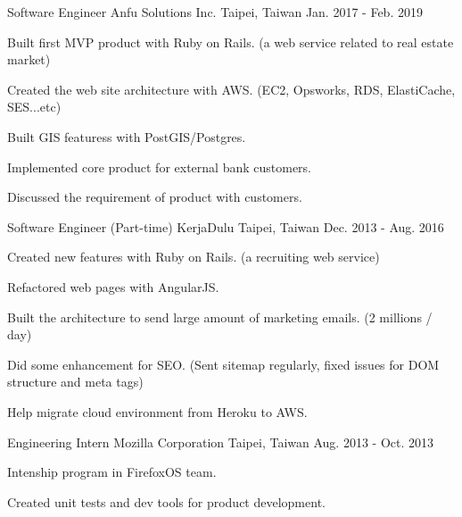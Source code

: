 \begin{cventries}
  \cventry
    {Software Engineer} %
    {Anfu Solutions Inc.} %
    {Taipei, Taiwan} %
    {Jan. 2017 - Feb. 2019} %
    {
      \begin{cvitems} %
        \item {Built first MVP product with Ruby on Rails. (a web service related to real estate market)}
        \item {Created the web site architecture with AWS. (EC2, Opsworks, RDS, ElastiCache, SES...etc)}
        \item {Built GIS featuress with PostGIS/Postgres.}
        \item {Implemented core product for external bank customers.}
        \item {Discussed the requirement of product with customers.}
      \end{cvitems}
    }

  \cventry
  {Software Engineer (Part-time)} %
  {KerjaDulu} %
  {Taipei, Taiwan} %
  {Dec. 2013 - Aug. 2016} %
  {
    \begin{cvitems} %
      \item {Created new features with Ruby on Rails. (a recruiting web service)}
      \item {Refactored web pages with AngularJS.}
      \item {Built the architecture to send large amount of marketing emails. (2 millions / day)}
      \item {Did some enhancement for SEO. (Sent sitemap regularly, fixed issues for DOM structure and meta tags)}
      \item {Help migrate cloud environment from Heroku to AWS.}
    \end{cvitems}
  }


  \cventry
  {Engineering Intern} %
  {Mozilla Corporation} %
  {Taipei, Taiwan} %
  {Aug. 2013 - Oct. 2013} %
  {
    \begin{cvitems} %
      \item {Intenship program in FirefoxOS team.}
      \item {Created unit tests and dev tools for product development.}
    \end{cvitems}
  }

\end{cventries}
